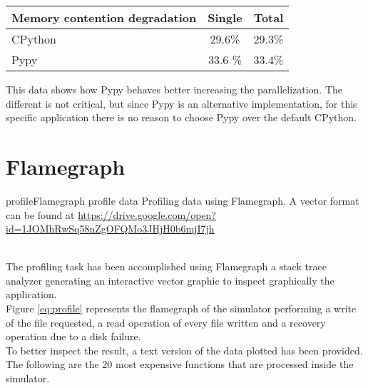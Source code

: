 \vspace{0.5cm} 
\begin{tabular}{l | c | c}
    \textbf{Memory contention degradation} & Single & Total \\\hline
    CPython & 29.6\% & 29.3\% \\
    Pypy & 33.6 \% & 33.4\% \\
\end{tabular}
\vspace{0.5cm}

This data shows how Pypy behaves better increasing the parallelization. The
different is not critical, but since Pypy is an alternative implementation,
for this specific application there is no reason to choose Pypy over the default
CPython.

\section{Flamegraph}\label{flamegraph}
\begin{myimage}{profile}{Flamegraph profile data}
    Profiling data using Flamegraph. A vector format can be found at
    \underline{\url{https://drive.google.com/open?id=1JOMhRwSq58nZgOFQMo3JHjH0b6mjI7jh}}
\end{myimage} \\

The profiling task has been accomplished using Flamegraph \cite{flamegraph} a
stack trace analyzer generating an interactive vector graphic to inspect
graphically the application. \\
Figure \ref{eq:profile} represents the flamegraph of the simulator performing a
write of the file requested, a read operation of every file written and a
recovery operation due to a disk failure. \\
To better inspect the result, a text version of the data plotted has been
provided. The following are the 20 most expensive functions that are processed
inside the simulator.

